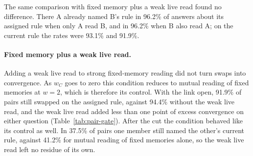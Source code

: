 The same comparison with fixed memory plus a weak live read found no
difference. There A already named B's rule in 96.2\% of answers
about its assigned rule when only A read B, and in 96.2\% when B
also read A; on the current rule the rates were 93.1\% and 91.9\%.

\paragraph{Fixed memory plus a weak live read.}
Adding a weak live read to strong fixed-memory reading did not turn
swaps into convergence. As $w_C$ goes to zero this condition reduces to
mutual reading of fixed memories at $w=2$, which is therefore its
control. With the link open, 91.9\% of pairs still swapped on the
assigned rule, against 94.4\% without the weak live read, and the weak
live read added less than one point of excess convergence on either
question (Table~\ref{tab:pair-gate}). After the cut the condition
behaved like its control as well. In 37.5\% of pairs one member still
named the other's current rule, against 41.2\% for mutual reading of
fixed memories alone, so the weak live read left no residue of its own.
